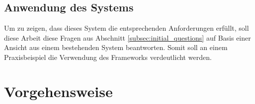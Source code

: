\subsection{Anwendung des Systems}
Um zu zeigen, dass dieses System die entsprechenden Anforderungen erfüllt, soll diese Arbeit diese Fragen aus Abschnitt \ref{subsec:initial_questions} auf Basis einer Ansicht aus einem bestehenden System beantworten. Somit soll an einem Praxisbeispiel die Verwendung des Frameworks verdeutlicht werden.

\section{Vorgehensweise}

